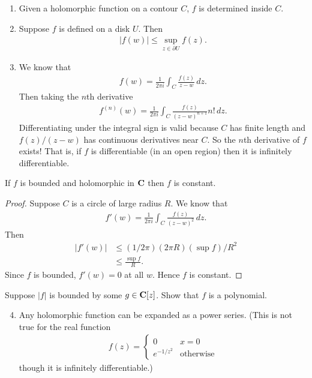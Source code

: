 \documentclass[11pt, oneside,margin=1in]{article}
\begin{document}
\begin{enumerate}
	\item Given a holomorphic function on a contour $C$, $f$ is determined inside $C$.
	\item Suppose $f$ is defined on a disk $U$. Then 
		\begin{align*}
			\left\lvert f(w) \right\rvert \le\sup_{z\in \partial U} f(z).
		\end{align*}
	\item We know that
		\begin{align*}
			f(w) =  \frac{1}{2\pi i} \int_{C}^{} \frac{f(z)}{z-w}  \, dz. 
		\end{align*}
		Then taking the $n$th derivative 
		\begin{align*}
			f^{ (n)}  (w) =  \frac{1}{2\pi i} \int_{C}^{} \frac{f(z)}{(z-w)^{n+1}} n! \, dz. 
		\end{align*}
		Differentiating under the integral sign is valid because $C$ has finite length and $f(z)/ (z-w)$ has continuous derivatives near $C$. So the $n$th derivative of $f$ exists! That is, if $f$ is differentiable (in an open region) then it is infinitely differentiable.
\end{enumerate}
\begin{theorem}[Liouville]\label{lvl}\index{}\text{}
If $f$ is bounded and holomorphic in $\mathbf C$ then $f$ is constant.
\end{theorem}
\begin{proof}
Suppose $C$ is a circle of large radius $R$. We know that
\begin{align*}
	f'(w) =  \frac{1}{2\pi i}\int_{C}^{} \frac{f(z)}{(z-w)^2}  \, dz. 
\end{align*}
Then 
\begin{align*}
	\left\lvert f'(w) \right\rvert &\le (1/2\pi)  (2\pi R)  (\sup f)/R^2 \\
				       &\le \frac{\sup f}{R}.
\end{align*}
Since $f$ is bounded, $f'(w)=0$ at all $w$. Hence $f$ is constant.
\end{proof}

\begin{exercise}\label{}\text{}
Suppose $\left\lvert f \right\rvert$ is bounded by some $g\in \mathbf C[z]$. Show that $f$ is a polynomial.
\end{exercise}
\begin{enumerate}
	\setcounter{enumi}{3}
	\item Any holomorphic function can be expanded as a power series. (This is not true for the real function
		\begin{align*}
			f(z) = 
			 \begin{cases}
				 0  & x=0\\
				 e^{-1/z^2} &\textrm{otherwise}
			\end{cases}
		\end{align*}
		though it is infinitely differentiable.)
\end{enumerate}
\end{document}
